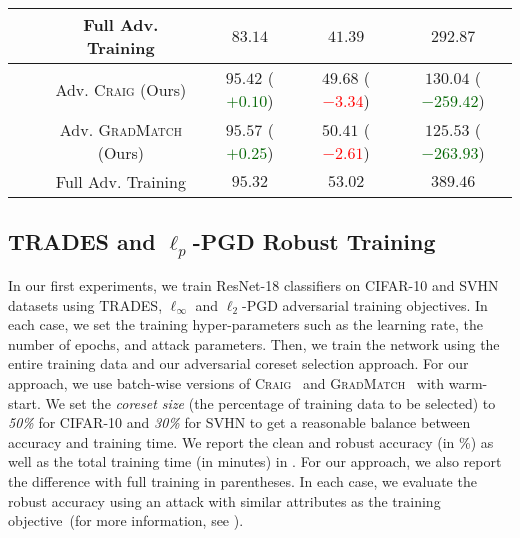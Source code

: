 \documentclass[runningheads]{llncs}
\begin{document}
\begin{table}[t!]
\begin{center}
\begin{scriptsize}
\begin{tabular}{cccccc}
				&& Full Adv. Training              & $83.14$                                       & $41.39$                                             &  $292.87$\\
				\midrule
				\multirow{3}{*}{\rotatebox[origin=c]{90}{\tiny{\textbf{$\ell_2$-PGD}}}} & \multirow{3}{*}{\rotatebox[origin=c]{90}{\tiny{\textbf{SVHN}}}}
				&  Adv. \textsc{Craig} (Ours)      & $95.42$ (\textcolor{darkgreen}{$+0.10$})            & $49.68$ (\textcolor{red}{$-3.34$})            &  $130.04$ (\textcolor{darkgreen}{$-259.42$})\\
				&& Adv. \textsc{GradMatch} (Ours)  & $95.57$ (\textcolor{darkgreen}{$+0.25$})            & $50.41$ (\textcolor{red}{$-2.61$})            &  $125.53$ (\textcolor{darkgreen}{$-263.93$})\\
				&& Full Adv. Training              & $95.32$                                             & $53.02$                                       &  $389.46$\\
				\bottomrule
			\end{tabular}
		\end{scriptsize}
	\end{center}
\end{table}

\subsection{TRADES and $\ell_p$-PGD Robust Training}
In our first experiments, we train ResNet-18 classifiers on CIFAR-10 and SVHN datasets using TRADES, $\ell_\infty$ and $\ell_2$-PGD adversarial training objectives.
In each case, we set the training hyper-parameters such as the learning rate, the number of epochs, and attack parameters.
Then, we train the network using the entire training data and our adversarial coreset selection approach.
For our approach, we use batch-wise versions of \textsc{Craig}~\cite{mirzasoleiman2020craig} and \textsc{GradMatch}~\cite{killamsetty2021gradmatch} with warm-start.
We set the \textit{coreset size} (the percentage of training data to be selected) to \textit{50\%} for CIFAR-10 and \textit{30\%} for SVHN to get a reasonable balance between accuracy and training time.
We report the clean and robust accuracy (in \%) as well as the total training time (in minutes) in .
For our approach, we also report the difference with full training in parentheses.
In each case, we evaluate the robust accuracy using an attack with similar attributes as the training objective~(for more information, see ).
\end{document}
